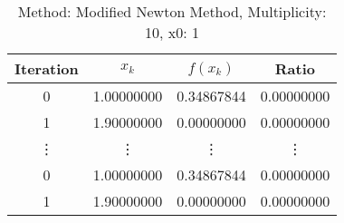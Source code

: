 \begin{table}
\centering
\caption{Method: Modified Newton Method, Multiplicity: 10, x0: 1}
\label{tab:table_Modified_Newton_Method_10_1}
\begin{tabular}{c c c c}
\toprule
Iteration &      $x_k$ &   $f(x_k)$ &      Ratio \\
\midrule
        0 & 1.00000000 & 0.34867844 & 0.00000000 \\
        1 & 1.90000000 & 0.00000000 & 0.00000000 \\
   \vdots &     \vdots &     \vdots &     \vdots \\
        0 & 1.00000000 & 0.34867844 & 0.00000000 \\
        1 & 1.90000000 & 0.00000000 & 0.00000000 \\
\bottomrule
\end{tabular}
\end{table}
